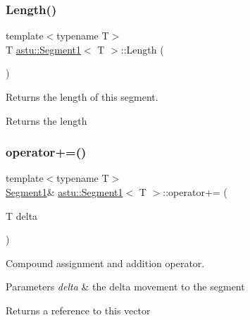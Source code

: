 \subsubsection{\texorpdfstring{Length()}{Length()}}
{\footnotesize\ttfamily template$<$typename T$>$ \\
T \hyperlink{classastu_1_1Segment1}{astu\+::\+Segment1}$<$ T $>$\+::Length (\begin{DoxyParamCaption}{ }\end{DoxyParamCaption})\hspace{0.3cm}{\ttfamily [inline]}}

Returns the length of this segment.

\begin{DoxyReturn}{Returns}
the length 
\end{DoxyReturn}
\mbox{\label{classastu_1_1Segment1_a8d762aaefb9b496edb08fd5bccb59b2b}} 
\subsubsection{\texorpdfstring{operator+=()}{operator+=()}}
{\footnotesize\ttfamily template$<$typename T$>$ \\
\hyperlink{classastu_1_1Segment1}{Segment1}\& \hyperlink{classastu_1_1Segment1}{astu\+::\+Segment1}$<$ T $>$\+::operator+= (\begin{DoxyParamCaption}\item[{T}]{delta }\end{DoxyParamCaption})\hspace{0.3cm}{\ttfamily [inline]}}

Compound assignment and addition operator.


\begin{DoxyParams}{Parameters}
{\em delta} & the delta movement to the segment \\
\hline
\end{DoxyParams}
\begin{DoxyReturn}{Returns}
a reference to this vector 
\end{DoxyReturn}
\mbox{\label{classastu_1_1Segment1_a772bf5f74555481a8e9e8dd562169ae8}} 
